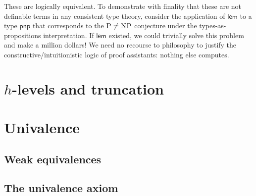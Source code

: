 \documentclass[12pt,twoside,draft]{reedthesis}
\makeatletter
\newcommand{\TODO}[1]{\marginpar{\footnotesize\color{TODO}todo: #1}}
\let\oldindex\index
\renewcommand{\index}[1]{\oldindex{#1}\marginpar{\footnotesize\color{index}index: #1}}
\newcommand{\indeX}[1]{\oldindex{#1}}
\newcommand{\abbreviation}[1]{\textbf{#1}\indeX{#1@\textbf{#1}}} %
\newtheorem{notation}[theorem]{Notation}
\makeatother
\begin{document}
\noindent These are logically equivalent. To demonstrate with finality that
these are not definable terms in any consistent type theory, consider the
application of $\mathsf{lem}$ to a type $\mathsf{pnp}$ that corresponds to the
$\textsc{P}\neq\textsc{NP}$ conjecture under the types-as-propositions
interpretation. If $\mathsf{lem}$ existed, we could trivially solve this problem
and make a million dollars! We need no recourse to philosophy to justify the
constructive/intuitionistic logic of proof assistants: nothing else computes.

\section{$h$-levels and truncation}
\label{sec:$h$-levels and truncation}

\section{Univalence}
\label{sec:univalence}

\subsection{Weak equivalences}
\label{subsec:weak-equivalences}


\subsection{The univalence axiom}
\label{subsec:the-univalence-axiom}


\end{document}
